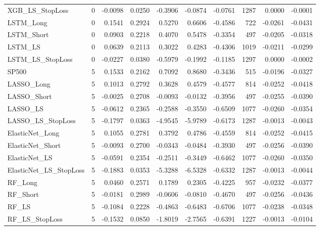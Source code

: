 \begin{tabular}{llrrrrrrrr}
\cline{1-10}
XGB\_LS\_StopLoss & 0 & -0.0098 & 0.0250 & -0.3906 & -0.0874 & -0.0761 & 1287 & 0.0000 & -0.0001 \\
\cline{1-10}
LSTM\_Long & 0 & 0.1541 & 0.2924 & 0.5270 & 0.6606 & -0.4586 & 722 & -0.0261 & -0.0431 \\
\cline{1-10}
LSTM\_Short & 0 & 0.0903 & 0.2218 & 0.4070 & 0.5478 & -0.3354 & 497 & -0.0205 & -0.0318 \\
\cline{1-10}
LSTM\_LS & 0 & 0.0639 & 0.2113 & 0.3022 & 0.4283 & -0.4306 & 1019 & -0.0211 & -0.0299 \\
\cline{1-10}
LSTM\_LS\_StopLoss & 0 & -0.0227 & 0.0380 & -0.5979 & -0.1992 & -0.1185 & 1297 & 0.0000 & -0.0002 \\
\cline{1-10}
SP500 & 5 & 0.1533 & 0.2162 & 0.7092 & 0.8680 & -0.3436 & 515 & -0.0196 & -0.0327 \\
\cline{1-10}
LASSO\_Long & 5 & 0.1013 & 0.2792 & 0.3628 & 0.4579 & -0.4577 & 814 & -0.0252 & -0.0418 \\
\cline{1-10}
LASSO\_Short & 5 & -0.0025 & 0.2708 & -0.0093 & -0.0132 & -0.3956 & 497 & -0.0255 & -0.0390 \\
\cline{1-10}
LASSO\_LS & 5 & -0.0612 & 0.2365 & -0.2588 & -0.3550 & -0.6509 & 1077 & -0.0260 & -0.0354 \\
\cline{1-10}
LASSO\_LS\_StopLoss & 5 & -0.1797 & 0.0363 & -4.9545 & -5.9789 & -0.6173 & 1287 & -0.0013 & -0.0043 \\
\cline{1-10}
ElasticNet\_Long & 5 & 0.1055 & 0.2781 & 0.3792 & 0.4786 & -0.4559 & 814 & -0.0252 & -0.0415 \\
\cline{1-10}
ElasticNet\_Short & 5 & -0.0093 & 0.2700 & -0.0343 & -0.0484 & -0.3930 & 497 & -0.0256 & -0.0390 \\
\cline{1-10}
ElasticNet\_LS & 5 & -0.0591 & 0.2354 & -0.2511 & -0.3449 & -0.6462 & 1077 & -0.0260 & -0.0350 \\
\cline{1-10}
ElasticNet\_LS\_StopLoss & 5 & -0.1883 & 0.0353 & -5.3288 & -6.5328 & -0.6332 & 1287 & -0.0013 & -0.0044 \\
\cline{1-10}
RF\_Long & 5 & 0.0460 & 0.2571 & 0.1789 & 0.2305 & -0.4225 & 957 & -0.0232 & -0.0377 \\
\cline{1-10}
RF\_Short & 5 & -0.0181 & 0.2989 & -0.0606 & -0.0810 & -0.4670 & 497 & -0.0256 & -0.0436 \\
\cline{1-10}
RF\_LS & 5 & -0.1084 & 0.2228 & -0.4863 & -0.6483 & -0.6706 & 1077 & -0.0238 & -0.0348 \\
\cline{1-10}
RF\_LS\_StopLoss & 5 & -0.1532 & 0.0850 & -1.8019 & -2.7565 & -0.6391 & 1227 & -0.0013 & -0.0104 \\

\end{tabular}
